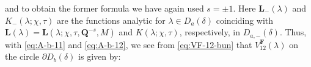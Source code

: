 and to obtain the former formula we have again used $s=\pm 1$. 
Here $\mathbf{L}_-(\lambda)$ and $K_-(\lambda;\chi,\tau)$ are the functions analytic for $\lambda\in D_a(\delta)$ coinciding with $\mathbf{L}(\lambda)=\mathbf{L}(\lambda;\chi,\tau,\mathbf{Q}^{-s},M)$ and  $K(\lambda;\chi,\tau)$, respectively, in $D_{a,-}(\delta)$. 
Thus, with \eqref{eq:A-b-11} and \eqref{eq:A-b-12}, we see from \eqref{eq:VF-12-bun} that $V^{\mathbf{F}}_{12}(\lambda)$ on the circle $\partial D_b(\delta)$ is given by:
